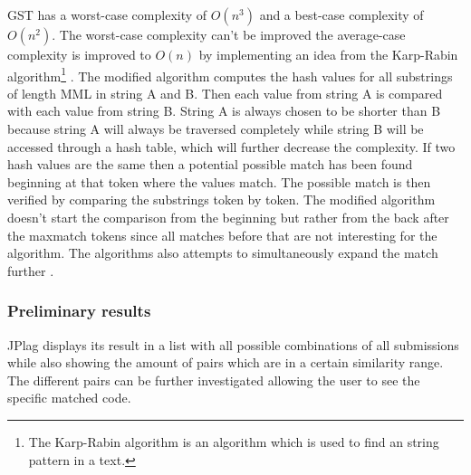 \documentclass[a4paper, 11pt]{article}
\renewcommand{\\}{\vspace*{0.5\baselineskip} \newline}
\begin{document}
GST has a worst-case complexity of \(O(n^3)\)\autocite[p. 5]{GST} and a best-case complexity of \(O(n^2)\)\autocite[p. 14]{JPlagP}. The worst-case
complexity can't be improved the average-case complexity is improved to \(O(n)\) by implementing an idea from the Karp-Rabin algorithm\footnote{The Karp-Rabin algorithm is an algorithm which is used to find an string pattern in a text\autocite{KRA}.}
\autocite*[p. 14]{JPlagP}. The modified algorithm computes the hash values for all substrings of length MML in string A and B. Then each value from
string A is compared with each value from string B. String A is always chosen to be shorter than B because string A will always be traversed completely
while string B will be accessed through a hash table, which will further decrease the complexity. If two hash values are the same then a potential possible match has
been found beginning at that token where the values match. The possible match is then verified by comparing the substrings token by token. 
The modified algorithm doesn't start the comparison from the beginning but rather from the back after the maxmatch tokens since all matches before that
are not interesting for the algorithm. The algorithms also attempts to simultaneously expand the match further \autocite[p. 14]{JPlagP}.

\subsubsection{Preliminary results}

JPlag displays its result in a list with all possible combinations of all submissions while also showing the amount of pairs which are in a certain
similarity range. The different pairs can be further investigated allowing the user to see the specific matched code.
\end{document}
